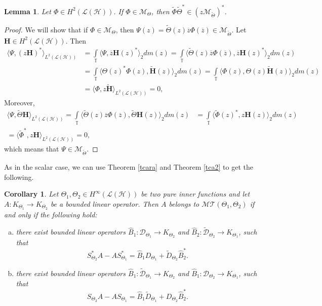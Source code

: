 \documentclass[11pt]{amsart}
\numberwithin{equation}{section}
\newcommand{\hsp}{\mathcal{H}}
\newcommand{\oL }{\mathcal{L}(\hsp) }
\newcommand{\hh}{{\mathbf{H}}}
\newtheorem{corollary}[theorem]{Corollary}
\newtheorem{lemma}[theorem]{Lemma}
\theoremstyle{definition}
\numberwithin{equation}{section}
\begin{document}
\begin{lemma}\label{5.6}
Let $\Phi\in H^2(\oL)$. If $\Phi\in \mathcal{M}_\Theta$, then $\widetilde{\Phi}\widetilde{\Theta}^*\in (z\mathcal{M}_{\widetilde{\Theta}})^*$.
\end{lemma}
\begin{proof}
We will show that if $\Phi\in \mathcal{M}_\Theta$, then $\Psi(z)=\widetilde{\Theta}(z)\overline{z}\Phi(\overline{z})\in \mathcal{M}_{\widetilde{\Theta}}$.
Let $\hh\in H^2(\oL)$. Then
\begin{align*}
\langle \Psi, (z\hh)^*\rangle_{L^2(\oL)}
&=\int\limits_{\mathbb{T}}\langle \Psi, \overline{z}\hh(z)^*\rangle_2dm(z)
=\int\limits_{\mathbb{T}}\langle \widetilde{\Theta}(z)\overline{z}\Phi(\overline{z}), \overline{z}\hh(z)^*\rangle_2dm(z)\\
&=\int\limits_{\mathbb{T}}\langle \Theta(z)^*\Phi(z), \widetilde{\hh}(z)\rangle_2dm(z)
=\int\limits_{\mathbb{T}}\langle\Phi(z), \Theta(z)\widetilde{\hh}(z)\rangle_2dm(z)\\
&=\langle \Phi, z\widetilde{\hh}\rangle_{L^2(\oL)}=0,
\end{align*}
Moreover,
\begin{align*}
\langle \Psi, \widetilde{\Theta}\hh\rangle_{L^2(\oL)}
=\int\limits_{\mathbb{T}}\langle \widetilde{\Theta}(z)\overline{z}\Phi(\overline{z}), \widetilde{\Theta}\hh(z)\rangle_2dm(z)
&=\int\limits_{\mathbb{T}}\langle \widetilde{\Phi}(z)^*, z\hh(z)\rangle_2dm(z)\\
=\langle \widetilde{\Phi}^*, z\hh\rangle_{L^2(\oL)}=0,
\end{align*}
which means that $\Psi\in \mathcal{M}_{\widetilde{\Theta}}$.
\end{proof}
As in the scalar case, we can use Theorem \ref{tcara} and Theorem \ref{tca2} to get the following.
\begin{corollary}
Let $\Theta_1, \Theta_2\in H^\infty(\oL)$ be two pure inner functions and let $A:K_{\Theta_1}\to K_{\Theta_2}$ be a bounded linear operator. Then $A$ belongs to $\mathcal{MT}(\Theta_1, \Theta_2)$ if and only if the following hold:
\begin{enumerate}[(a)]
\item there exist bounded linear operators $\widehat{B}_1:\mathcal{D}_{\Theta_1}\to K_{\Theta_2}$ and $\widehat{B}_2:\widetilde{{\mathcal{D}}}_{\Theta_2}\to K_{\Theta_1}$, such that
    $$S_{\Theta_2}^*A-AS_{\Theta_1}^*=\widehat{B}_1D_{\Theta_1}+\widetilde{D}_{\Theta_2}\widehat{B}_2^*.$$\label{i}
    \item there exist bounded linear operators $\widehat{B}_1:\widetilde{\mathcal{D}}_{\Theta_1}\to K_{\Theta_2}$ and $\widehat{B}_1:\mathcal{D}_{\Theta_2}\to K_{\Theta_1}$, such that
        $$S_{\Theta_2}A-AS_{\Theta_1}=\widehat{B}_1\widetilde{D}_{\Theta_1}+D_{\Theta_2}\widehat{B}_{2}^*.$$\label{ii}
\end{enumerate}
\end{corollary}
\end{document}
